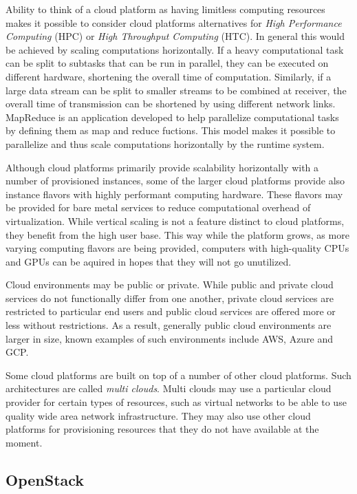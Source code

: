 \documentclass[officiallayout]{tktla}
\begin{document}
Ability to think of a cloud platform as having limitless computing resources
makes it possible to consider cloud platforms alternatives for \textit{High
Performance Computing} (HPC) or \textit{High Throughput Computing} (HTC). In
general this would be achieved by scaling computations horizontally. If a heavy
computational task can be split to subtasks that can be run in parallel, they
can be executed on different hardware, shortening the overall time of
computation. Similarly, if a large data stream can be split to smaller streams
to be combined at receiver, the overall time of transmission can be shortened
by using different network links. MapReduce \cite{mapreduce} is an application
developed to help parallelize computational tasks by defining them as map and
reduce fuctions. This model makes it possible to parallelize and thus scale
computations horizontally by the runtime system.

Although cloud platforms primarily provide scalability horizontally with a
number of provisioned instances, some of the larger cloud platforms provide
also instance flavors with highly performant computing hardware. These flavors
may be provided for bare metal services to reduce computational overhead of
virtualization. While vertical scaling is not a feature distinct to cloud
platforms, they benefit from the high user base. This way while the platform
grows, as more varying computing flavors are being provided, computers with
high-quality CPUs and GPUs can be aquired in hopes that they will not go
unutilized.

Cloud environments may be public or private. While public and private cloud
services do not functionally differ from one another, private cloud services
are restricted to particular end users and public cloud services are offered
more or less without restrictions. As a result, generally public cloud
environments are larger in size, known examples of such environments include
AWS, Azure and GCP.

Some cloud platforms are built on top of a number of other cloud platforms.
Such architectures are called \textit{multi clouds}. Multi clouds may use a
particular cloud provider for certain types of resources, such as virtual
networks to be able to use quality wide area network infrastructure. They may
also use other cloud platforms for provisioning resources that they do not have
available at the moment.

\subsection{OpenStack}
\end{document}
